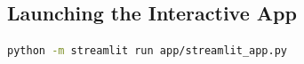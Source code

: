 \documentclass[12pt,a4paper]{article}
\begin{document}
\subsection{Launching the Interactive App}
\begin{lstlisting}[language=bash]
python -m streamlit run app/streamlit_app.py
\end{lstlisting}



\end{document}

